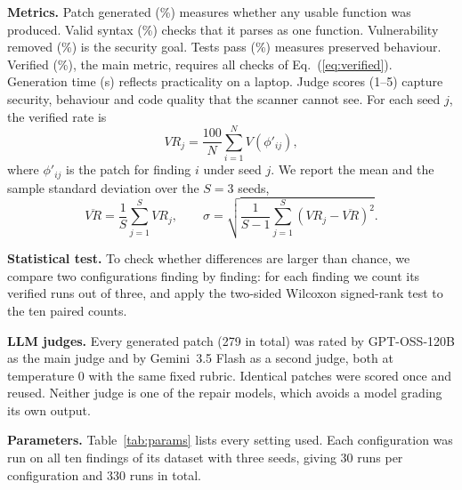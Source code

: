 \documentclass[12pt,onecolumn,draftclsnofoot]{IEEEtran}
\begin{document}
\textbf{Metrics.} Patch generated (\%) measures whether any usable function was produced. Valid syntax (\%) checks that it parses as one function. Vulnerability removed (\%) is the security goal. Tests pass (\%) measures preserved behaviour. Verified (\%), the main metric, requires all checks of Eq.~(\ref{eq:verified}). Generation time (s) reflects practicality on a laptop. Judge scores (1--5) capture security, behaviour and code quality that the scanner cannot see. For each seed $j$, the verified rate is
\begin{equation}
VR_j=\frac{100}{N}\sum_{i=1}^{N}V(\phi'_{ij}),
\label{eq:vr}
\end{equation}
where $\phi'_{ij}$ is the patch for finding $i$ under seed $j$. We report the mean and the sample standard deviation over the $S=3$ seeds,
\begin{equation}
\overline{VR}=\frac{1}{S}\sum_{j=1}^{S}VR_j, \qquad \sigma=\sqrt{\frac{1}{S-1}\sum_{j=1}^{S}\left(VR_j-\overline{VR}\right)^2}.
\label{eq:meanstd}
\end{equation}

\textbf{Statistical test.} To check whether differences are larger than chance, we compare two configurations finding by finding: for each finding we count its verified runs out of three, and apply the two-sided Wilcoxon signed-rank test to the ten paired counts.

\textbf{LLM judges.} Every generated patch (279 in total) was rated by GPT-OSS-120B \cite{openai2025gptoss} as the main judge and by Gemini~3.5 Flash as a second judge, both at temperature 0 with the same fixed rubric. Identical patches were scored once and reused. Neither judge is one of the repair models, which avoids a model grading its own output.

\textbf{Parameters.} Table~\ref{tab:params} lists every setting used. Each configuration was run on all ten findings of its dataset with three seeds, giving 30 runs per configuration and 330 runs in total.
\end{document}
